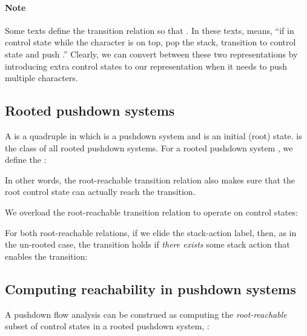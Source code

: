 \paragraph{Note}
Some texts define the transition relation  so that 
.
In these texts,  means, ``if in control state  while the
character  is on top, pop the stack, transition to
control state  and push .''
Clearly, we can convert between these two representations by
introducing extra control states to our representation when it needs
to push multiple characters.



\subsection{Rooted pushdown systems}

A  is a quadruple 
 in which 
 is a pushdown system and
 is an initial (root) state.
  is the class of all rooted pushdown
systems.
For a rooted pushdown system , we define 
the :

In other words, the root-reachable transition relation also makes
sure that the root control state can actually reach the transition.


We overload the root-reachable transition relation to operate on
control states:

For both root-reachable relations, if we elide the stack-action label,
then, as in the un-rooted case, the transition holds if \emph{there
  exists} some stack action that enables the transition:
  


\subsection{Computing reachability in pushdown systems}

A pushdown flow analysis 
can be construed as
  computing the \emph{root-reachable}
  subset of control states in a rooted pushdown system, 
  :

